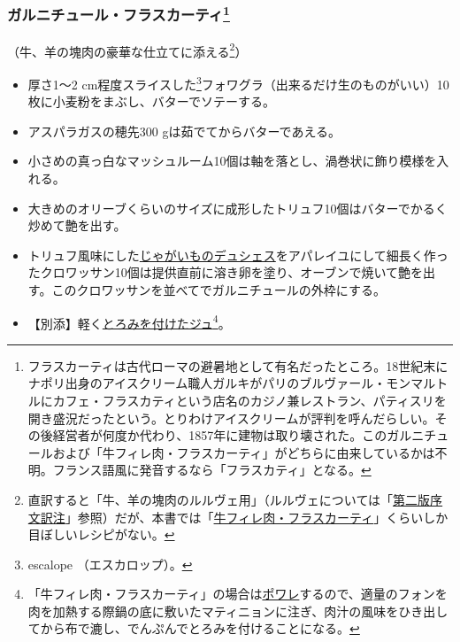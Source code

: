 \begin{recette}
\atoaki{}

\hypertarget{garniture-frascati}{%
\subsubsection[ガルニチュール・フラスカーティ]{\texorpdfstring{ガルニチュール・フラスカーティ\footnote{フラスカーティは古代ローマの避暑地として有名だったところ。18世紀末にナポリ出身のアイスクリーム職人ガルキがパリのブルヴァール・モンマルトルにカフェ・フラスカティという店名のカジノ兼レストラン、パティスリを開き盛況だったという。とりわけアイスクリームが評判を呼んだらしい。その後経営者が何度か代わり、1857年に建物は取り壊された。このガルニチュールおよび「牛フィレ肉・フラスカーティ」がどちらに由来しているかは不明。フランス語風に発音するなら「フラスカティ」となる。}}{ガルニチュール・フラスカーティ}}\label{garniture-frascati}}



（牛、羊の塊肉の豪華な仕立てに添える\footnote{直訳すると「牛、羊の塊肉のルルヴェ用」（ルルヴェについては「\protect\hyperlink{releve}{第二版序文訳注}」参照）だが、本書では「\protect\hyperlink{filet-de-boeur-frascati}{牛フィレ肉・フラスカーティ}」くらいしか目ぼしいレシピがない。}）

\begin{itemize}
\item
  厚さ1〜2 cm程度スライスした\footnote{escalope （エスカロップ）。}フォワグラ（出来るだけ生のものがいい）10枚に小麦粉をまぶし、バターでソテーする。
\item
  アスパラガスの穂先300 gは茹でてからバターであえる。
\item
  小さめの真っ白なマッシュルーム10個は軸を落とし、渦巻状に飾り模様を入れる。
\item
  大きめのオリーブくらいのサイズに成形したトリュフ10個はバターでかるく炒めて艶を出す。
\item
  トリュフ風味にした\protect\hyperlink{pommes-de-terre-duchesse}{じゃがいものデュシェス}をアパレイユにして細長く作ったクロワッサン10個は提供直前に溶き卵を塗り、オーブンで焼いて艶を出す。このクロワッサンを並べてでガルニチュールの外枠にする。
\item
  【別添】軽く\protect\hyperlink{jus-de-veau-lie}{とろみを付けたジュ}\footnote{「牛フィレ肉・フラスカーティ」の場合は\protect\hyperlink{les-poeles}{ポワレ}するので、適量のフォンを肉を加熱する際鍋の底に敷いたマティニョンに注ぎ、肉汁の風味をひき出してから布で漉し、でんぷんでとろみを付けることになる。}。
\end{itemize}


\end{recette}
